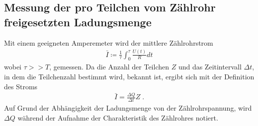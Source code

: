 \subsection{Messung der pro Teilchen vom Zählrohr freigesetzten Ladungsmenge }
Mit einem geeigneten Amperemeter wird der mittlere Zählrohrstrom
\begin{align}
  \bar{I} \coloneqq \frac{1}{\tau} \int_0^\tau \frac{U(t)}{R} dt
  \label{eq:Strom1}
\end{align}
wobei $\tau >> T$, gemessen.
Da die Anzahl der Teilchen $Z$ und das Zeitintervall $\Delta t$, in dem die Teilchenzahl bestimmt wird, bekannt ist, ergibt sich mit der Definition des Stroms
\begin{align}
  \bar{I} = \frac{\Delta Q}{\Delta t} Z\;.
  \label{eq:Strom2}
\end{align}
Auf Grund der Abhängigkeit der Ladungsmenge von der Zählrohrspannung, wird $\Delta Q$ während der Aufnahme der Charakteristik des Zählrohres notiert.
